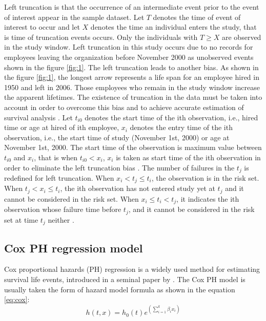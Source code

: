 \documentclass[12pt,letterpaper]{article}
\begin{document}
 Left truncation is that the occurrence of an intermediate event prior to the event of interest appear in the sample dataset. Let $T$ denotes the time of event of interest to occur and let $X$ denotes the time an individual enters the study, that is time of truncation events occurs. Only the individuals with $T \geq X$ are observed in the study window. Left truncation in this study occurs due to no records for employees leaving the organization before November 2000 as unobserved events shown in the figure \ref{fig:1}. The left truncation leads to another bias. As shown in the figure \ref{fig:1}, the longest arrow represents a life span for an employee hired in 1950 and left in 2006. Those employees who remain in the study window increase the apparent lifetimes. The existence of truncation in the data must be taken into account in order to overcome this bias and to achieve accurate estimation of survival analysis \citep{carrion2010}. Let $t_{i0}$ denotes the start time of the ith observation, i.e., hired time or age at hired of ith employee, $x_{i}$ denotes the entry time of the ith observation, i.e., the start time of study (November 1st, 2000) or age at November 1st, 2000. The start time of the observation is maximum value between $t_{i0}$ and $x_i$, that is when $t_{i0} < x_i $, $x_i$ is taken as start time of the ith observation in order to eliminate the left truncation bias \citep{allison1995}. The number of failures in the $t_j$ is redefined for left truncation. When $x_i < t_j \le t_i$, the observation is in the risk set. When $t_{j} < x_i \le t_i$, the ith observation has not entered study yet at $t_j$ and it cannot be considered in the risk set. When $x_i \le t_i < t_j$, it indicates the ith observation whose failure time before $t_j$, and it cannot be considered in the risk set at time $t_j$ neither \citep{carrion2010}.


\subsection{Cox PH regression model}
Cox proportional hazards (PH) regression is a widely used method for estimating survival life events, introduced in a seminal paper by \citet{cox1972}. The Cox PH model is usually taken the form of hazard model formula as shown in the equation \ref{eq:cox}:
   \begin{equation}
   \label{eq:cox}
   h(t,x)=h_0(t)e^{(\sum_{i=1}^{k}\beta_ix_i)}
   \end{equation}
\end{document}
